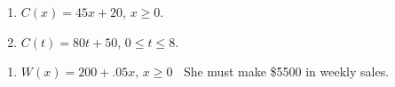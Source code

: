 \begin{multicols}{2}
\begin{enumerate}
\setcounter{enumi}{\value{HW}}


\item  $C(x) = 45x+20$, $x \geq 0$.
\item  $C(t) = 80t + 50$,  $0 \leq t \leq 8$.
\setcounter{HW}{\value{enumi}}
\end{enumerate}
\end{multicols}


\begin{enumerate}
\setcounter{enumi}{\value{HW}}


\item  $W(x) = 200 + .05x,\, x \geq 0\;\;$ She must make \$5500 in weekly sales.

\setcounter{HW}{\value{enumi}}
\end{enumerate}


